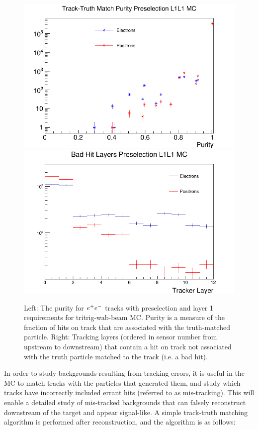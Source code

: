 \begin{figure}[t]
    \centering
    \includegraphics[width=.45\textwidth]{figs/recon/purity.png}
    \includegraphics[width=.45\textwidth]{figs/recon/badhit_layers.png}
    \caption{Left: The purity for $e^{+}e^{-}$ tracks with preselection and layer 1 requirements for tritrig-wab-beam MC. Purity is a measure of the fraction of hits on track that are associated with the truth-matched particle. Right: Tracking layers (ordered in sensor number from upstream to downstream) that contain a hit on track not associated with the truth particle matched to the track (i.e. a bad hit).}
    \label{fig:truth_match}
\end{figure}

In order to study backgrounds resulting from tracking errors, it is useful in the MC to match tracks with the particles that generated them, and study which tracks have incorrectly included errant hits (referred to as mis-tracking). This will enable a detailed study of mis-tracked backgrounds that can falsely reconstruct downstream of the target and appear signal-like. A simple track-truth matching algorithm is performed after reconstruction, and the algorithm is as follows:


